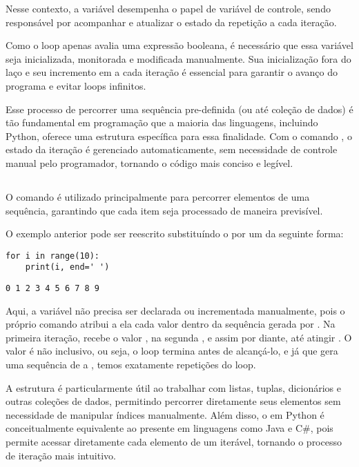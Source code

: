 Nesse contexto, a variável  desempenha o papel de variável de controle, sendo responsável
por acompanhar e atualizar o estado da repetição a cada iteração.

Como o loop  apenas avalia uma expressão booleana, é necessário que essa variável seja inicializada, monitorada e
modificada manualmente.
Sua inicialização fora do laço e seu incremento em  a cada iteração é essencial para garantir o
avanço do programa e evitar loops infinitos.

Esse processo de percorrer uma sequência pre-definida (ou até coleção de dados) é tão fundamental em programação
que a maioria das linguagens, incluindo Python, oferece uma estrutura específica para essa finalidade.
Com o comando , o estado da iteração é gerenciado automaticamente, sem
necessidade de controle manual pelo programador, tornando o código mais conciso e legível.

\subsection{}

O comando  é utilizado principalmente para percorrer elementos de uma sequência,
garantindo que cada item seja processado de maneira previsível.

O exemplo anterior pode ser reescrito substituíndo o  por um  da seguinte forma:
\begin{verbatim}
for i in range(10):
    print(i, end=' ')
\end{verbatim}
\begin{verbatim}
0 1 2 3 4 5 6 7 8 9
\end{verbatim}

Aqui, a variável  não precisa ser declarada ou incrementada manualmente, pois o próprio
comando  atribui a ela cada valor dentro da sequência gerada por .
Na primeira iteração,  recebe o valor , na segunda , e assim por diante,
até atingir .
O valor  é não inclusivo, ou seja, o loop termina antes de alcançá-lo, e já que  gera uma
sequência de  a , temos exatamente  repetições do loop.

A estrutura  é particularmente útil ao trabalhar com listas, tuplas, dicionários e outras coleções
de dados, permitindo percorrer diretamente seus elementos sem necessidade de manipular índices manualmente.
Além disso, o  em Python é conceitualmente equivalente ao  presente em linguagens
como Java e C\#, pois permite acessar diretamente cada elemento de um iterável, tornando o processo de iteração
mais intuitivo.

